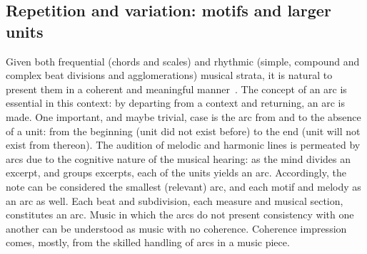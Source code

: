 \subsection{Repetition and variation: motifs and larger units}\label{subsec:motivos}
Given both frequential (chords and scales) and rhythmic (simple, compound and complex beat divisions and agglomerations) musical strata, it is
natural to present them in a coherent and meaningful manner~\cite{Boulez}.
The concept of an arc is essential in this context:
by departing from a context and returning, an arc is made.
One important, and maybe trivial, case is the arc from and to the absence of a unit: from the beginning (unit did not exist before) to the end (unit will not exist from thereon).
The audition of melodic and harmonic lines is permeated by
arcs due to the cognitive nature of the musical hearing: as the mind divides an excerpt, and groups excerpts, each of the units yields an arc.
Accordingly, the note can be considered the smallest (relevant) arc, and each motif and melody as an arc as well.
Each beat and subdivision, each measure and musical
section, constitutes an arc. Music in which the arcs do not present consistency with one another can be understood as music with no coherence. Coherence impression
comes, mostly, from the skilled handling of arcs in a music piece.

